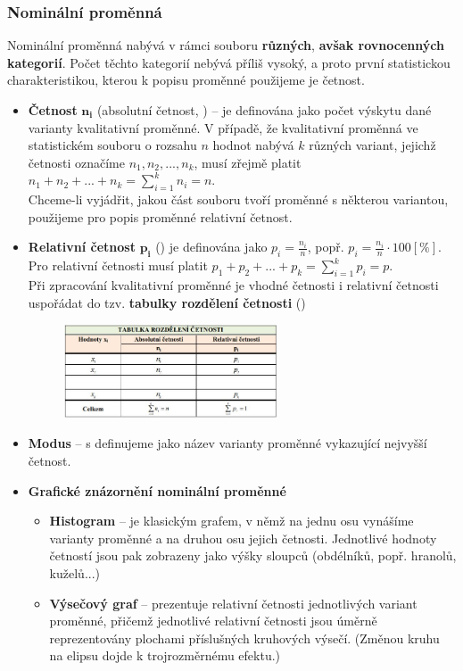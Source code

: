 \subsubsection{Nominální proměnná}
Nominální proměnná nabývá v rámci souboru \textbf{různých}, \textbf{avšak rovnocenných kategorií}. Počet těchto kategorií nebývá příliš vysoký, a proto první statistickou charakteristikou, kterou k popisu proměnné použijeme je četnost.
\begin{itemize}
	\item \textbf{Četnost} $\mathbf{n_i}$ (absolutní četnost, ) --  je definována jako počet výskytu dané varianty kvalitativní proměnné. V případě, že kvalitativní proměnná ve statistickém souboru o rozsahu $n$ hodnot  nabývá $k$ různých variant, jejichž četnosti označíme $n_1, n_2, ... , n_k$, musí zřejmě platit $n_1 + n_2 + ... + n_k = \sum\limits_{i=1}^k n_i = n$. \\
	Chceme-li vyjádřit, jakou část souboru tvoří proměnné s některou variantou, použijeme pro popis proměnné relativní četnost.

	\item \textbf{Relativní četnost} $\mathbf{p_i}$ () je definována jako $p_i = \frac{n_i}{n}$, popř. $p_i = \frac{n_i}{n} \cdot 100 [\%]$. Pro relativní četnosti musí platit $p_1 + p_2 + ... + p_k = \sum\limits_{i=1}^k p_i = p$. \\
	Při zpracování kvalitativní proměnné je vhodné četnosti i relativní četnosti uspořádat do tzv. \textbf{tabulky rozdělení četnosti} ()
				\begin{figure}[H]
				\centering
				\includegraphics[width=0.6\textwidth]{assets/13_tabl_cetnost}
				\end{figure}
	\item \textbf{Modus} -- s definujeme jako název varianty proměnné vykazující nejvyšší četnost.\\
	\item \textbf{Grafické znázornění nominální proměnné} 
	\begin{itemize}
		\item \textbf{Histogram} -- je klasickým grafem, v němž na jednu osu vynášíme varianty proměnné a na druhou osu jejich četnosti. Jednotlivé hodnoty četností jsou pak zobrazeny jako výšky sloupců (obdélníků, popř. hranolů, kuželů...)
		\item \textbf{Výsečový graf} -- prezentuje relativní četnosti jednotlivých variant proměnné, přičemž jednotlivé relativní četnosti jsou úměrně reprezentovány plochami příslušných kruhových výsečí. (Změnou kruhu na elipsu dojde k trojrozměrnému efektu.)
	\end{itemize}
\end{itemize}
